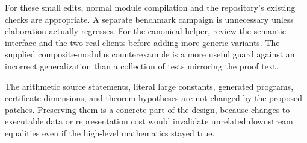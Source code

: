 For these small edits, normal module compilation and the repository's existing checks are appropriate. A separate benchmark campaign is unnecessary unless elaboration actually regresses. For the canonical helper, review the semantic interface and the two real clients before adding more generic variants. The supplied composite-modulus counterexample is a more useful guard against an incorrect generalization than a collection of tests mirroring the proof text.

The arithmetic source statements, literal large constants, generated programs, certificate dimensions, and theorem hypotheses are not changed by the proposed patches. Preserving them is a concrete part of the design, because changes to executable data or representation cost would invalidate unrelated downstream equalities even if the high-level mathematics stayed true.
